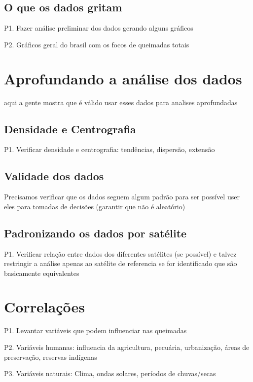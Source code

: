 \documentclass[cic,tc]{iiufrgs}
\begin{document}
\section{O que os dados gritam}

P1. Fazer análise preliminar dos dados gerando alguns gráficos \par
P2. Gráficos geral do brasil com os focos de queimadas totais \cite{geographicDataSciencePython} \par


\chapter{Aprofundando a análise dos dados}

aqui a gente mostra que é válido usar esses dados para analises aprofundadas

\section{Densidade e Centrografia}

P1. Verificar densidade e centrografia: tendências, dispersão, extensão \par

\section{Validade dos dados}

Precisamos verificar que os dados seguem algum padrão para ser possível
user eles para tomadas de decisões (garantir que não é aleatório) 
\cite[Point Pattern Analysis]{geographicDataSciencePython} \par

\section{Padronizando os dados por satélite}

P1. Verificar relação entre dados dos diferentes satélites (se possível) e talvez restringir a análise apenas ao satélite de referencia se for identificado que são basicamente equivalentes \par

\chapter{Correlações}

P1. Levantar variáveis que podem influenciar nas queimadas \par
P2. Variáveis humanas: influencia da agricultura, pecuária, 
urbanização, áreas de preservação, reservas indígenas \par
P3. Variáveis naturais: Clima, ondas solares, períodos de chuvas/secas \par





\end{document}
